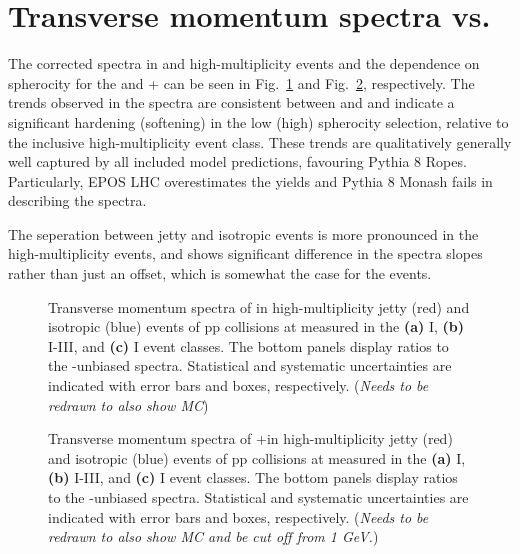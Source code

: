 \section{Transverse momentum spectra vs. \SOPT}

The corrected spectra in \VOM and \NSPD high-multiplicity events and the dependence on spherocity for the \KOs and \LA + \AL can be seen in Fig.~\ref{fig:sphero:k0spt} and Fig.~\ref{fig:sphero:lpt}, respectively.  The trends observed in the spectra are consistent between \KOs and \LA and indicate a significant hardening (softening) in the low (high) spherocity selection, relative to the inclusive high-multiplicity event class. These trends are qualitatively generally well captured by all included model predictions, favouring Pythia 8 Ropes. Particularly, EPOS LHC overestimates the yields and Pythia 8 Monash fails in describing the \LA \pt spectra.

The seperation between jetty and isotropic events is more pronounced in the \NSPD high-multiplicity events, and shows significant difference in the spectra slopes rather than just an offset, which is somewhat the case for the \VOM events.

\begin{figure}[H]%
\centering%
\caption{Transverse momentum spectra of \KOs in high-multiplicity jetty (red) and isotropic (blue) events of pp collisions at  measured in the \textbf{(a)} \NSPD I, \textbf{(b)} \NSPD I-III, and \textbf{(c)} \VOM I event classes. The bottom panels display ratios to the \SOPT-unbiased spectra. Statistical and systematic uncertainties are indicated with error bars and boxes, respectively. (\textit{Needs to be redrawn to also show MC})}
\label{fig:sphero:k0spt}
\end{figure}

\begin{figure}[H]%
\centering%
\caption{Transverse momentum spectra of \LA+\AL in high-multiplicity jetty (red) and isotropic (blue) events of pp collisions at  measured in the \textbf{(a)} \NSPD I, \textbf{(b)} \NSPD I-III, and \textbf{(c)} \VOM I event classes. The bottom panels display ratios to the \SOPT-unbiased spectra. Statistical and systematic uncertainties are indicated with error bars and boxes, respectively. (\textit{Needs to be redrawn to also show MC and be cut off from 1 GeV.})}
\label{fig:sphero:lpt}
\end{figure}

